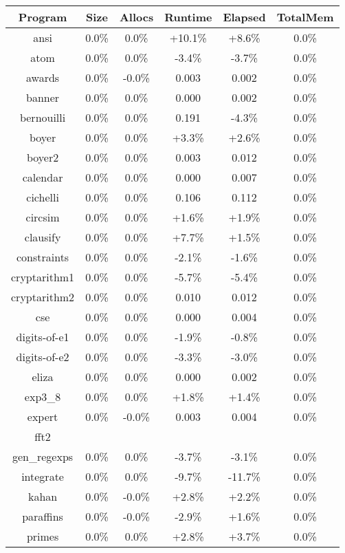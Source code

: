 \begin{tabular}{ c c c c c c }
Program & Size & Allocs & Runtime & Elapsed & TotalMem\\
\hline
ansi &  0.0\% &  0.0\% & +10.1\% & +8.6\% &  0.0\%\\
atom &  0.0\% &  0.0\% & -3.4\% & -3.7\% &  0.0\%\\
awards &  0.0\% & -0.0\% & 0.003 & 0.002 &  0.0\%\\
banner &  0.0\% &  0.0\% & 0.000 & 0.002 &  0.0\%\\
bernouilli &  0.0\% &  0.0\% & 0.191 & -4.3\% &  0.0\%\\
boyer &  0.0\% &  0.0\% & +3.3\% & +2.6\% &  0.0\%\\
boyer2 &  0.0\% &  0.0\% & 0.003 & 0.012 &  0.0\%\\
calendar &  0.0\% &  0.0\% & 0.000 & 0.007 &  0.0\%\\
cichelli &  0.0\% &  0.0\% & 0.106 & 0.112 &  0.0\%\\
circsim &  0.0\% &  0.0\% & +1.6\% & +1.9\% &  0.0\%\\
clausify &  0.0\% &  0.0\% & +7.7\% & +1.5\% &  0.0\%\\
constraints &  0.0\% &  0.0\% & -2.1\% & -1.6\% &  0.0\%\\
cryptarithm1 &  0.0\% &  0.0\% & -5.7\% & -5.4\% &  0.0\%\\
cryptarithm2 &  0.0\% &  0.0\% & 0.010 & 0.012 &  0.0\%\\
cse &  0.0\% &  0.0\% & 0.000 & 0.004 &  0.0\%\\
digits-of-e1 &  0.0\% &  0.0\% & -1.9\% & -0.8\% &  0.0\%\\
digits-of-e2 &  0.0\% &  0.0\% & -3.3\% & -3.0\% &  0.0\%\\
eliza &  0.0\% &  0.0\% & 0.000 & 0.002 &  0.0\%\\
exp3\_8 &  0.0\% &  0.0\% & +1.8\% & +1.4\% &  0.0\%\\
expert &  0.0\% & -0.0\% & 0.003 & 0.004 &  0.0\%\\
fft2 &  &  &  &  & \\
gen\_regexps &  0.0\% &  0.0\% & -3.7\% & -3.1\% &  0.0\%\\
integrate &  0.0\% &  0.0\% & -9.7\% & -11.7\% &  0.0\%\\
kahan &  0.0\% & -0.0\% & +2.8\% & +2.2\% &  0.0\%\\
paraffins &  0.0\% & -0.0\% & -2.9\% & +1.6\% &  0.0\%\\
primes &  0.0\% &  0.0\% & +2.8\% & +3.7\% &  0.0\%\\

\end{tabular}

